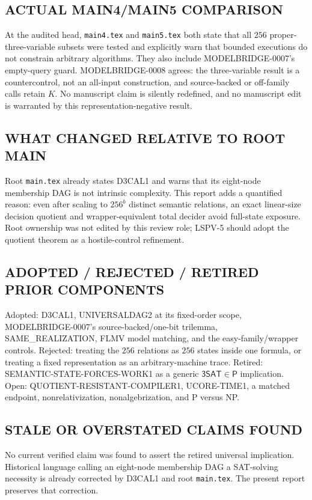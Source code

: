 \documentclass[11pt]{article}
\newcommand{\SAT}{\mathsf{3SAT}}
\begin{document}
\subsection*{ACTUAL MAIN4/MAIN5 COMPARISON}
At the audited head, \texttt{main4.tex} and \texttt{main5.tex} both state
that all $256$ proper-three-variable subsets were tested and explicitly warn
that bounded executions do not constrain arbitrary algorithms.  They also
include MODELBRIDGE-0007's empty-query guard.  MODELBRIDGE-0008 agrees: the
three-variable result is a countercontrol, not an all-input construction,
and source-backed or off-family calls retain $K$.  No manuscript claim is
silently redefined, and no manuscript edit is warranted by this
representation-negative result.

\subsection*{WHAT CHANGED RELATIVE TO ROOT MAIN}
Root \texttt{main.tex} already states D3CAL1 and warns that its eight-node
membership DAG is not intrinsic complexity.  This report adds a quantified
reason: even after scaling to $256^b$ distinct semantic relations, an exact
linear-size decision quotient and wrapper-equivalent total decider avoid
full-state exposure.  Root ownership was not edited by this review role;
LSPV-5 should adopt the quotient theorem as a hostile-control refinement.

\subsection*{ADOPTED / REJECTED / RETIRED PRIOR COMPONENTS}
Adopted: D3CAL1, UNIVERSALDAG2 at its fixed-order scope, MODELBRIDGE-0007's
source-backed/one-bit trilemma, SAME\_REALIZATION, FLMV model matching, and
the easy-family/wrapper controls.  Rejected: treating the $256$ relations as
$256$ states inside one formula, or treating a fixed representation as an
arbitrary-machine trace.  Retired: SEMANTIC-STATE-FORCES-WORK1 as a generic
$\SAT\in\mathsf P$ implication.  Open: QUOTIENT-RESISTANT-COMPILER1,
UCORE-TIME1, a matched endpoint, nonrelativization, nonalgebrization, and P
versus NP.

\subsection*{STALE OR OVERSTATED CLAIMS FOUND}
No current verified claim was found to assert the retired universal
implication.  Historical language calling an eight-node membership DAG a
SAT-solving necessity is already corrected by D3CAL1 and root
\texttt{main.tex}.  The present report preserves that correction.
\end{document}
